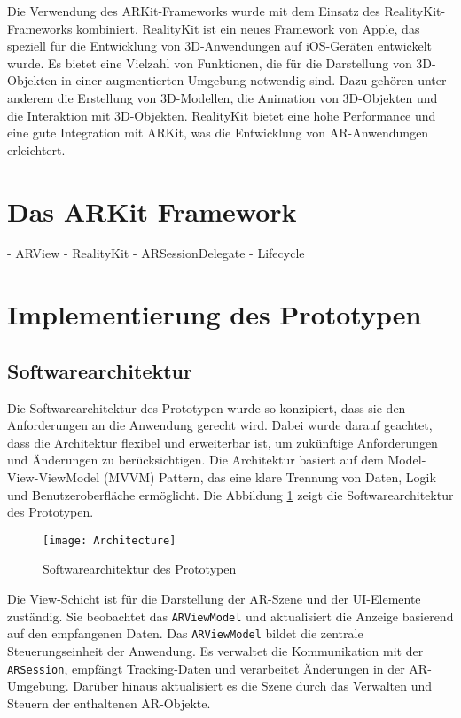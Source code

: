 Die Verwendung des ARKit-Frameworks wurde mit dem Einsatz des RealityKit-Frameworks kombiniert. RealityKit ist ein neues Framework von Apple, das speziell für die Entwicklung von 3D-Anwendungen auf iOS-Geräten entwickelt wurde. Es bietet eine Vielzahl von Funktionen, die für die Darstellung von 3D-Objekten in einer augmentierten Umgebung notwendig sind. Dazu gehören unter anderem die Erstellung von 3D-Modellen, die Animation von 3D-Objekten und die Interaktion mit 3D-Objekten. RealityKit bietet eine hohe Performance und eine gute Integration mit ARKit, was die Entwicklung von AR-Anwendungen erleichtert.

\section{Das ARKit Framework}
- ARView
- RealityKit
- ARSessionDelegate
- Lifecycle

\section{Implementierung des Prototypen}

\subsection{Softwarearchitektur}

Die Softwarearchitektur des Prototypen wurde so konzipiert, dass sie den Anforderungen an die Anwendung gerecht wird. Dabei wurde darauf geachtet, dass die Architektur flexibel und erweiterbar ist, um zukünftige Anforderungen und Änderungen zu berücksichtigen. Die Architektur basiert auf dem Model-View-ViewModel (MVVM) Pattern, das eine klare Trennung von Daten, Logik und Benutzeroberfläche ermöglicht. Die Abbildung \ref{fig:Architecture} zeigt die Softwarearchitektur des Prototypen.

\begin{figure}[ht]
    \centering
    \texttt{[image: Architecture]}
    \caption{Softwarearchitektur des Prototypen}
    \label{fig:Architecture}
\end{figure}

Die View-Schicht ist für die Darstellung der AR-Szene und der UI-Elemente zuständig. Sie beobachtet das \texttt{ARViewModel} und aktualisiert die Anzeige basierend auf den empfangenen Daten. Das \texttt{ARViewModel} bildet die zentrale Steuerungseinheit der Anwendung. Es verwaltet die Kommunikation mit der \texttt{ARSession}, empfängt Tracking-Daten und verarbeitet Änderungen in der AR-Umgebung. Darüber hinaus aktualisiert es die Szene durch das Verwalten und Steuern der enthaltenen AR-Objekte.

